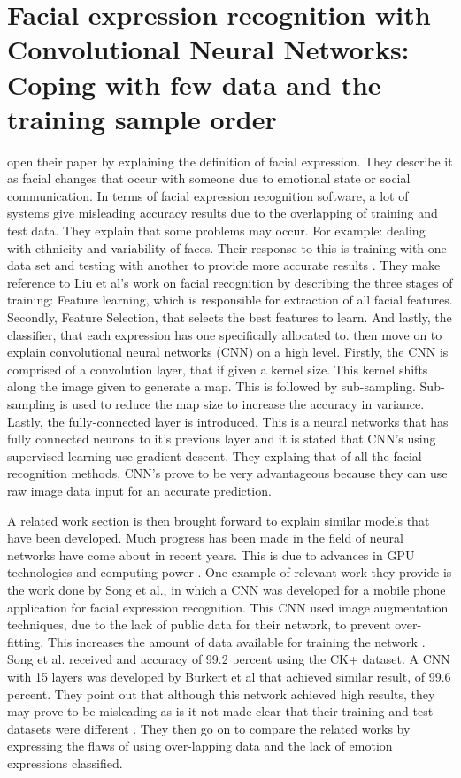 \section{Facial expression recognition with Convolutional Neural Networks: Coping with few data and the training sample order}
\citeauthor{LOPES} open their paper by explaining the definition of facial expression. They describe it as facial changes that occur with someone due to emotional state or social communication. In terms of facial expression recognition software, a lot of systems give misleading accuracy results due to the overlapping of training and test data. They explain that some problems may occur. For example: dealing with ethnicity and variability of faces. Their response to this is training with one data set and testing with another to provide more accurate results \citep{LOPES}. They make reference to Liu et al's work on facial recognition by describing the three stages of training: Feature learning, which is responsible for extraction of all facial features. Secondly, Feature Selection, that selects the best features to learn. And lastly, the classifier, that each expression has one specifically allocated to. \citeauthor{LOPES} then move on to explain convolutional neural networks (CNN) on a high level. Firstly, the CNN is comprised of a convolution layer, that if given a kernel size. This kernel shifts along the image given to generate a map. This is followed by sub-sampling. Sub-sampling is used to reduce the map size to increase the accuracy in variance. Lastly, the fully-connected layer is introduced. This is a neural networks that has fully connected neurons to it's previous layer \citep{LOPES} and it is stated that CNN's using supervised learning use gradient descent. They explaing that of all the facial recognition methods, CNN's prove to be very advantageous because they can use raw image data input for an accurate prediction. 

A related work section is then brought forward to explain similar models that have been developed. Much progress has been made in the field of neural networks have come about in recent years. This is due to advances in GPU technologies and computing power \cite{LOPES}. One example of relevant work they provide is the work done by Song et al., in which a CNN was developed for a mobile phone application for facial expression recognition. This CNN used image augmentation techniques, due to the lack of public data for their network, to prevent over-fitting. This increases the amount of data available for training the network \citep{LOPES}. Song et al. received and accuracy of 99.2 percent using the CK+ dataset. A CNN with 15 layers was developed by Burkert et al that achieved similar result, of 99.6 percent. They point out that although this network achieved high results, they may prove to be misleading as is it not made clear that their training and test datasets were different \citep{LOPES}. They then go on to compare the related works by expressing the flaws of using over-lapping data and the lack of emotion expressions classified.  

